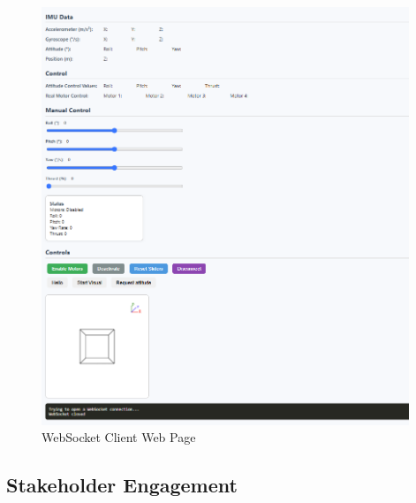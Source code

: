 \begin{figure}[H]
    \centering
    \includegraphics[width=0.98\textwidth]{img/websocket-page.PNG}
    \caption{WebSocket Client Web Page}
\end{figure}

\pagebreak

\subsection{Stakeholder Engagement}
\label{app:stakeholder-engagement}

